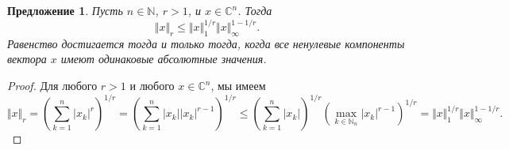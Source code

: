 \documentclass[12pt]{article}
\newtheorem{proposition}[theorem]{Предложение}
\begin{document}
\begin{proposition}\label{SpclLyapIneq}
    Пусть $n\in\mathbb{N}$, $r>1$, и $x\in\mathbb{C}^n$. Тогда
    \[
        \Vert x\Vert_r\leq \Vert x\Vert_1^{1/r}\Vert x\Vert_\infty^{1-1/r}.
    \]
    Равенство достигается тогда и только тогда, когда все ненулевые компоненты
    вектора $x$ имеют одинаковые абсолютные значения.
\end{proposition}
\begin{proof}
    Для любого $r>1$ и любого $x\in\mathbb{C}^n$, мы имеем
    \[
        \Vert x\Vert_r
        =\left(\sum_{k=1}^n |x_k|^r \right)^{1/r}
        =\left(\sum_{k=1}^n |x_k| |x_k|^{r-1} \right)^{1/r}
        \leq\left(\sum_{k=1}^n |x_k| \right)^{1/r} 
        \left(\max\limits_{k\in\mathbb{N}_n}|x_k|^{r-1}\right)^{1/r}
        =\Vert x\Vert_1^{1/r}\Vert x\Vert_\infty^{1-1/r}.
    \]
\end{proof}
\end{document}
